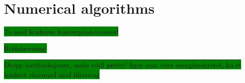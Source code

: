 
\chapter{Numerical algorithms} %

\label{numerics} %



\colorbox{green}{Ta med konkrete konvergensteoremer! }

\colorbox{green}{Rettskrivning! }

\colorbox{green}{Dropp hattfunksjoner, make ediff pretty! figur som viser energispekteret, ha et konkret eksempel med filtrering }



